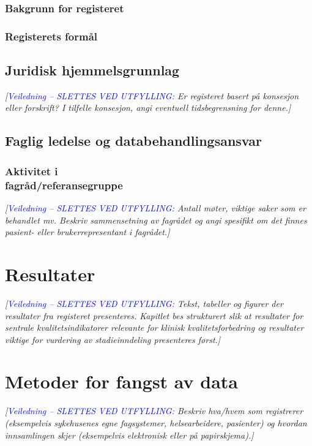 \documentclass[norsk, a4paper, twocolumn]{report}
\newcommand{\newtext}[1]{\cbstart\textcolor{blue}{#1\cbend}}
\newcommand{\guide}[1] {
	\textit{[\textcolor{guidegray}{\newtext{Veiledning -- SLETTES VED UTFYLLING:} #1}]}
	}
\begin{document}
\subsection{Bakgrunn for registeret}\label{sec:bak}
\subsection{Registerets formål}\label{sec:for}

\section{Juridisk hjemmelsgrunnlag}\label{cha:jur}
\guide{Er registeret basert på konsesjon eller forskrift? I tilfelle
konsesjon, angi eventuell tidsbegrensning for denne.}

\section{Faglig ledelse og databehandlingsansvar}\label{cha:led}
\subsection{Aktivitet i\\fagråd/referansegruppe}
\guide{Antall møter, viktige saker som er behandlet mv. Beskriv sammensetning av
fagrådet og angi spesifikt om det finnes pasient- eller brukerrepresentant i
fagrådet.}




\chapter{Resultater}\label{cha:res}
\guide{Tekst, tabeller og figurer der resultater fra registeret
presenteres. Kapitlet bes strukturert slik at resultater for sentrale
kvalitetsindikatorer relevante for klinisk kvalitetsforbedring og
resultater viktige for vurdering av stadieinndeling presenteres først.}




\chapter{Metoder for fangst av data}\label{cha:metoder}
\guide{Beskriv hva/hvem som registrerer (eksempelvis sykehusenes egne
fagsystemer, helsearbeidere, pasienter) og hvordan innsamlingen skjer
(eksempelvis elektronisk eller på papirskjema).}
\end{document}
